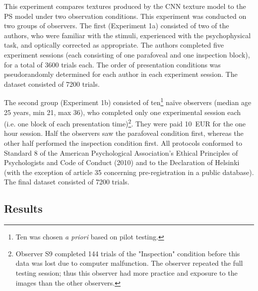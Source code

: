 \documentclass[article, 11pt,a4paper,natbib]{apa6}\usepackage[]{graphicx}\usepackage[]{color}
\begin{document}
This experiment compares textures produced by the CNN texture model to the PS model under two observation conditions.
This experiment was conducted on two groups of observers.
The first (Experiment 1a) consisted of two of the authors, who were familiar with the stimuli, experienced with the psychophysical task, and optically corrected as appropriate.
The authors completed five experiment sessions (each consisting of one parafoveal and one inspection block), for a total of 3600 trials each.
The order of presentation conditions was pseudorandomly determined for each author in each experiment session.
The dataset consisted of 7200 trials.



The second group (Experiment 1b) consisted of ten\footnote{Ten was chosen \textit{a priori} based on pilot testing.} na\"{i}ve observers (median age 25 years, min 21, max 36), who completed only one experimental session each (i.e. one block of each presentation time)\footnote{
Observer S9 completed 144 trials of the "Inspection" condition before this data was lost due to computer malfunction. The observer repeated the full testing session; thus this observer had more practice and exposure to the images than the other observers.}.
They were paid 10~EUR for the one hour session.
Half the observers saw the parafoveal condition first, whereas the other half performed the inspection condition first.
All protocols conformed to Standard 8 of the American Psychological Association’s Ethical Principles of Psychologists and Code of Conduct (2010) and to the Declaration of Helsinki (with the exception of article 35 concerning pre-registration in a public database).
The final dataset consisted of 7200 trials.

\subsection{Results}
\end{document}
